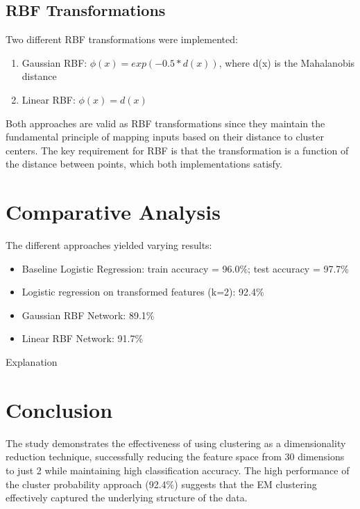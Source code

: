 \documentclass{article}
\begin{document}
\subsection{RBF Transformations}
Two different RBF transformations were implemented:
\begin{enumerate}
    \item Gaussian RBF: $\phi(x) = exp(-0.5 * d(x))$, where d(x) is the Mahalanobis distance
    \item Linear RBF: $\phi(x) = d(x)$
\end{enumerate}

Both approaches are valid as RBF transformations since they maintain the fundamental principle of mapping inputs based on their distance to cluster centers. The key requirement for RBF is that the transformation is a function of the distance between points, which both implementations satisfy.
    
\section{Comparative Analysis}
The different approaches yielded varying results:
\begin{itemize}
    \item Baseline Logistic Regression: train accuracy = 96.0\%; test accuracy = 97.7\%
    \item Logistic regression on transformed features (k=2): 92.4\%
    \item Gaussian RBF Network: 89.1\%
    \item Linear RBF Network: 91.7\%
\end{itemize}

Explanation %

\section{Conclusion}
The study demonstrates the effectiveness of using clustering as a dimensionality reduction technique, successfully reducing the feature space from 30 dimensions to just 2 while maintaining high classification accuracy. The high performance of the cluster probability approach (92.4\%) suggests that the EM clustering effectively captured the underlying structure of the data.



\end{document}

